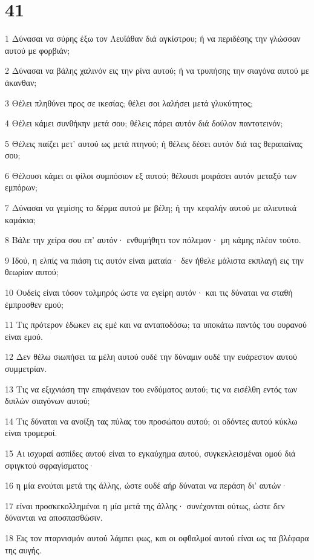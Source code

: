 \chapter{41}

\par 1 Δύνασαι να σύρης έξω τον Λευϊάθαν διά αγκίστρου; ή να περιδέσης την γλώσσαν αυτού με φορβιάν;
\par 2 Δύνασαι να βάλης χαλινόν εις την ρίνα αυτού; ή να τρυπήσης την σιαγόνα αυτού με άκανθαν;
\par 3 Θέλει πληθύνει προς σε ικεσίας; θέλει σοι λαλήσει μετά γλυκύτητος;
\par 4 Θέλει κάμει συνθήκην μετά σου; θέλεις πάρει αυτόν διά δούλον παντοτεινόν;
\par 5 Θέλεις παίζει μετ' αυτού ως μετά πτηνού; ή θέλεις δέσει αυτόν διά τας θεραπαίνας σου;
\par 6 Θέλουσι κάμει οι φίλοι συμπόσιον εξ αυτού; θέλουσι μοιράσει αυτόν μεταξύ των εμπόρων;
\par 7 Δύνασαι να γεμίσης το δέρμα αυτού με βέλη; ή την κεφαλήν αυτού με αλιευτικά καμάκια;
\par 8 Βάλε την χείρα σου επ' αυτόν· ενθυμήθητι τον πόλεμον· μη κάμης πλέον τούτο.
\par 9 Ιδού, η ελπίς να πιάση τις αυτόν είναι ματαία· δεν ήθελε μάλιστα εκπλαγή εις την θεωρίαν αυτού;
\par 10 Ουδείς είναι τόσον τολμηρός ώστε να εγείρη αυτόν· και τις δύναται να σταθή έμπροσθεν εμού;
\par 11 Τις πρότερον έδωκεν εις εμέ και να ανταποδόσω; τα υποκάτω παντός του ουρανού είναι εμού.
\par 12 Δεν θέλω σιωπήσει τα μέλη αυτού ουδέ την δύναμιν ουδέ την ευάρεστον αυτού συμμετρίαν.
\par 13 Τις να εξιχνιάση την επιφάνειαν του ενδύματος αυτού; τις να εισέλθη εντός των διπλών σιαγόνων αυτού;
\par 14 Τις δύναται να ανοίξη τας πύλας του προσώπου αυτού; οι οδόντες αυτού κύκλω είναι τρομεροί.
\par 15 Αι ισχυραί ασπίδες αυτού είναι το εγκαύχημα αυτού, συγκεκλεισμέναι ομού διά σφιγκτού σφραγίσματος·
\par 16 η μία ενούται μετά της άλλης, ώστε ουδέ αήρ δύναται να περάση δι' αυτών·
\par 17 είναι προσκεκολλημέναι η μία μετά της άλλης· συνέχονται ούτως, ώστε δεν δύνανται να αποσπασθώσιν.
\par 18 Εις τον πταρνισμόν αυτού λάμπει φως, και οι οφθαλμοί αυτού είναι ως τα βλέφαρα της αυγής.
